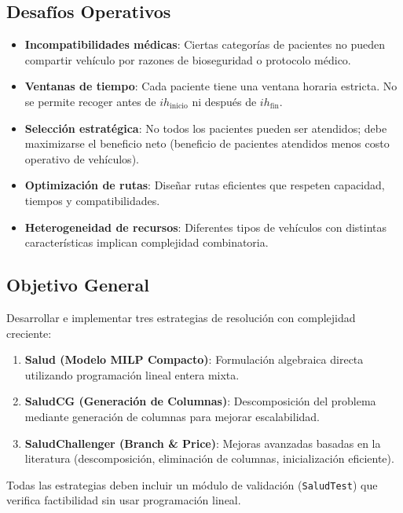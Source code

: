 \documentclass[12pt]{article}
\numberwithin{algorithm}{section}
\begin{document}
\subsection{Desafíos Operativos}

\begin{itemize}
    \item \textbf{Incompatibilidades médicas}: Ciertas categorías de pacientes no pueden compartir vehículo por razones de bioseguridad o protocolo médico.
    \item \textbf{Ventanas de tiempo}: Cada paciente tiene una ventana horaria estricta. No se permite recoger antes de $ih_{\text{inicio}}$ ni después de $ih_{\text{fin}}$.
    \item \textbf{Selección estratégica}: No todos los pacientes pueden ser atendidos; debe maximizarse el beneficio neto (beneficio de pacientes atendidos menos costo operativo de vehículos).
    \item \textbf{Optimización de rutas}: Diseñar rutas eficientes que respeten capacidad, tiempos y compatibilidades.
    \item \textbf{Heterogeneidad de recursos}: Diferentes tipos de vehículos con distintas características implican complejidad combinatoria.
\end{itemize}

\subsection{Objetivo General}

Desarrollar e implementar tres estrategias de resolución con complejidad creciente:

\begin{enumerate}
    \item \textbf{Salud (Modelo MILP Compacto)}: Formulación algebraica directa utilizando programación lineal entera mixta.
    \item \textbf{SaludCG (Generación de Columnas)}: Descomposición del problema mediante generación de columnas para mejorar escalabilidad.
    \item \textbf{SaludChallenger (Branch \& Price)}: Mejoras avanzadas basadas en la literatura (descomposición, eliminación de columnas, inicialización eficiente).
\end{enumerate}

Todas las estrategias deben incluir un módulo de validación (\texttt{SaludTest}) que verifica factibilidad sin usar programación lineal.
\end{document}
